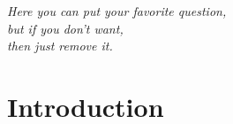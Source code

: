 \begin{savequote}[80mm]
{
\slshape
    Here you can put your favorite question, \\
    but if you don't want, \\
    then just remove it. \\
}
\end{savequote}

\chapter{Introduction}
\label{chap:intro}
%




